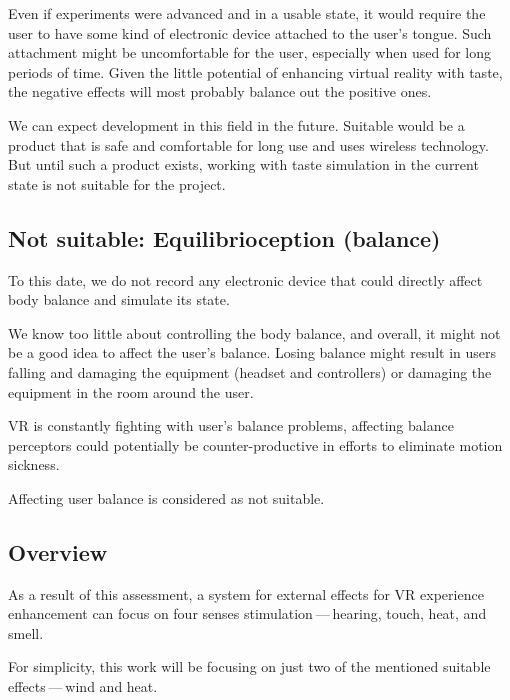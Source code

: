 Even if experiments were advanced and in a usable state, it would
require the user to have some kind of electronic device attached to the user’s
tongue. Such attachment might be uncomfortable for the user, especially when
used for long periods of time. Given the little potential of enhancing virtual
reality with taste, the negative effects will most probably balance out
the positive ones.


We can expect development in this field in the future. Suitable would be a product
that is safe and comfortable for long use and uses wireless
technology. But until such a product exists, working with taste simulation
in the current state is not suitable for the project.


\subsection{Not suitable: Equilibrioception (balance)}
To this date, we do not record any electronic device that could
directly affect body balance and simulate its state.

We know too little about controlling the body balance, and overall,
it might not be a good idea to affect the user’s balance. Losing
balance might result in users falling and damaging the equipment (headset and
controllers) or damaging the equipment in the room around the user.

VR is constantly fighting with user’s balance problems,
affecting balance perceptors could potentially be
counter-productive in efforts to eliminate motion sickness.

Affecting user balance is considered as not suitable.

\newpage


\hypertarget{x-overview}{\subsection{Overview}}
As a result of this assessment, a system for external effects for VR experience
enhancement can focus on four senses stimulation — hearing, touch, heat,
and smell.


For simplicity, this work will be focusing on just two of the mentioned suitable
effects — wind and heat.

